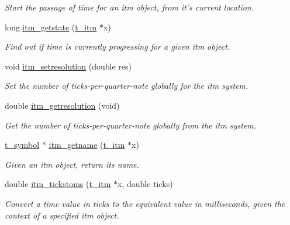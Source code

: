 \begin{DoxyCompactItemize}
\begin{DoxyCompactList}\small\item\em Start the passage of time for an itm object, from it's current location. \item\end{DoxyCompactList}\item 
long \hyperlink{group__time_ga36ee91bc9951d71880a055445ecd7ba7}{itm\_\-getstate} (\hyperlink{group__time_gac656fa1f920c69cf77e6631bcec53077}{t\_\-itm} $\ast$x)
\begin{DoxyCompactList}\small\item\em Find out if time is currently progressing for a given itm object. \item\end{DoxyCompactList}\item 
void \hyperlink{group__time_gac777d53869fe6e01bdce0c34f868f648}{itm\_\-setresolution} (double res)
\begin{DoxyCompactList}\small\item\em Set the number of ticks-\/per-\/quarter-\/note globally for the itm system. \item\end{DoxyCompactList}\item 
double \hyperlink{group__time_gaba77c4fbb00c349342b6358d80644113}{itm\_\-getresolution} (void)
\begin{DoxyCompactList}\small\item\em Get the number of ticks-\/per-\/quarter-\/note globally from the itm system. \item\end{DoxyCompactList}\item 
\hyperlink{structt__symbol}{t\_\-symbol} $\ast$ \hyperlink{group__time_ga0daf42c6199b38f486998f2e5d2c8a11}{itm\_\-getname} (\hyperlink{group__time_gac656fa1f920c69cf77e6631bcec53077}{t\_\-itm} $\ast$x)
\begin{DoxyCompactList}\small\item\em Given an itm object, return its name. \item\end{DoxyCompactList}\item 
double \hyperlink{group__time_ga3ed676dca6666ab9f305ea81b8d1b6b7}{itm\_\-tickstoms} (\hyperlink{group__time_gac656fa1f920c69cf77e6631bcec53077}{t\_\-itm} $\ast$x, double ticks)
\begin{DoxyCompactList}\small\item\em Convert a time value in ticks to the equivalent value in milliseconds, given the context of a specified itm object. \item\end{DoxyCompactList}\item 

\end{DoxyCompactItemize}
